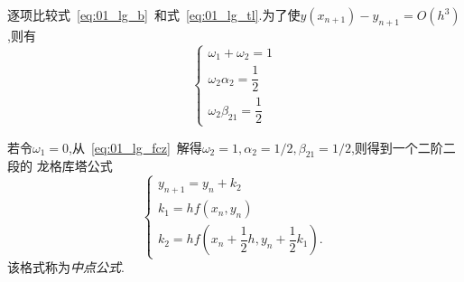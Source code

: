 \documentclass[a4paper,cs4size,adobefonts,fancyhdr]{ctexart}[2005/11/25]
\begin{document}
逐项比较式~\eqref{eq:01_lg_b}~和式~\eqref{eq:01_lg_tl}.为了使$y(x_{n+1})-y_{n+1}=O(h^3)$,则有
\begin{equation}\label{eq:01_lg_fcz}
 \begin{cases}
  \omega_1+\omega_2 =1 \\[0.6em]
  \omega_2\alpha_2=\dfrac{1}{2} \\[0.6em]
  \omega_2\beta_{21}=\dfrac{1}{2} 
 \end{cases}
\end{equation}\par
若令$\omega_1=0$,从~\eqref{eq:01_lg_fcz}~解得$\omega_2=1,\alpha_2=1/2,\beta_{21}=1/2$,则得到一个二阶二段的
龙格库塔公式
\begin{equation}
 \begin{cases}
  y_{n+1} =y_n+k_2 \\
  k_1=hf(x_n,y_n) \\
  k_2=hf\left(x_n+\dfrac{1}{2}h,y_n+\dfrac{1}{2}k_1\right).
 \end{cases}
\end{equation}
该格式称为\emph{中点公式}.
\end{document}
